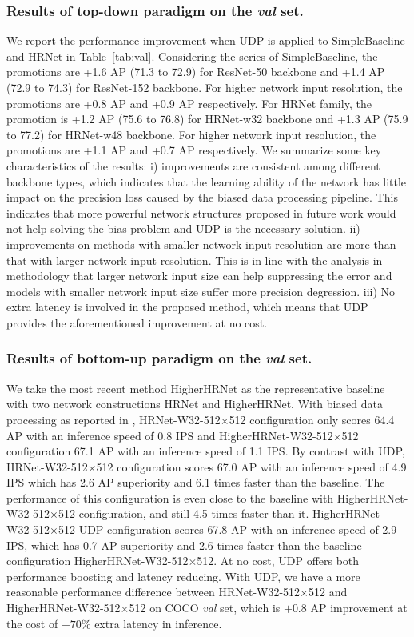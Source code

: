 \documentclass[10pt,journal,compsoc]{IEEEtran}
\begin{document}
\subsubsection{Results of top-down paradigm on the \textit{val} set.}
We report the performance improvement when UDP is applied to SimpleBaseline \cite{SBNet} and HRNet \cite{HRNet} in Table~\ref{tab:val}.
Considering the series of SimpleBaseline, the promotions are +1.6 AP (71.3 to 72.9) for ResNet-50 backbone and +1.4 AP (72.9 to 74.3) for ResNet-152 backbone. For higher network input resolution, the promotions are +0.8 AP and +0.9 AP respectively.
For HRNet family, the promotion is +1.2 AP (75.6 to 76.8) for HRNet-w32 backbone and +1.3 AP (75.9 to 77.2) for HRNet-w48 backbone. For higher network input resolution, the promotions are +1.1 AP and +0.7 AP respectively.
We summarize some key characteristics of the results: i) improvements are consistent among different backbone types, which indicates that the learning ability of the network has little impact on the precision loss caused by the biased data processing pipeline. This indicates that more powerful network structures proposed in future work would not help solving the bias problem and UDP is the necessary solution. ii) improvements on methods with smaller network input resolution are more than that with larger network input resolution. This is in line with the analysis in methodology that larger network input size can help suppressing the error and models with smaller network input size suffer more precision degression. iii) No extra latency is involved in the proposed method, which means that UDP provides the aforementioned improvement at no cost.

\subsubsection{Results of bottom-up paradigm on the \textit{val} set.}
We take the most recent method HigherHRNet \cite{Higher} as the representative baseline with two network constructions HRNet and HigherHRNet. With biased data processing as reported in \cite{Higher}, HRNet-W32-512$\times$512 configuration only scores 64.4 AP with an inference speed of 0.8 IPS and HigherHRNet-W32-512$\times$512 configuration 67.1 AP with an inference speed of 1.1 IPS. By contrast with UDP, HRNet-W32-512$\times$512 configuration scores 67.0 AP with an inference speed of 4.9 IPS which has 2.6 AP superiority and 6.1 times faster than the baseline. The performance of this configuration is even close to the baseline with HigherHRNet-W32-512$\times$512 configuration, and still 4.5 times faster than it. HigherHRNet-W32-512$\times$512-UDP configuration scores 67.8 AP with an inference speed of 2.9 IPS, which has 0.7 AP superiority and 2.6 times faster than the baseline configuration HigherHRNet-W32-512$\times$512. At no cost, UDP offers both performance boosting and latency reducing. With UDP, we have a more reasonable performance difference between HRNet-W32-512$\times$512 and HigherHRNet-W32-512$\times$512 on COCO \textit{val} set, which is $+0.8$ AP improvement at the cost of $+70\%$ extra latency in inference.
\end{document}
